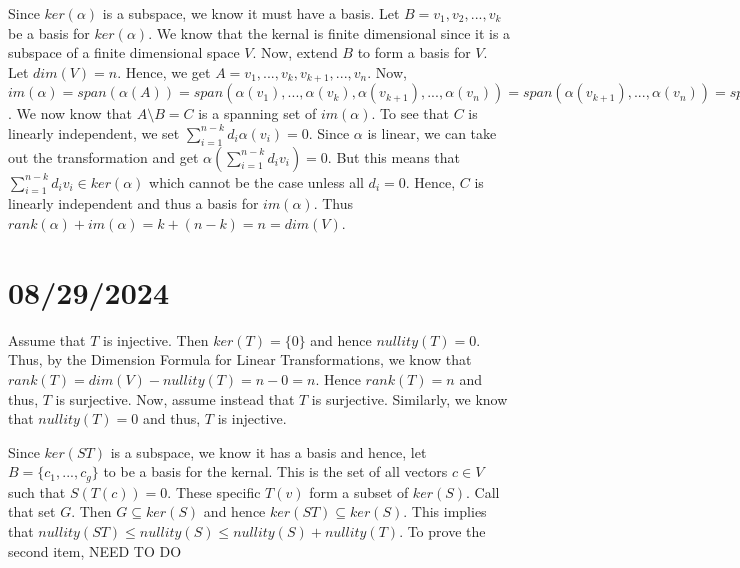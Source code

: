 \documentclass{report}
\begin{document}
\begin{myproof}
    Since $ker(\alpha)$ is a subspace, we know it must have a basis. Let $B = {v_1, v_2, ..., v_k}$ be a basis for $ker(\alpha)$. We know that the kernal is finite dimensional since it is a subspace of a finite dimensional space $V$. Now, extend $B$ to form a basis for $V$. Let $dim(V) = n$. Hence, we get $A = {v_1, ..., v_k, v_{k+1}, ..., v_n}$. Now, $im(\alpha) = span(\alpha(A)) = span(\alpha(v_1), ..., \alpha(v_k), \alpha(v_{k+1}), ..., \alpha(v_n)) = span(\alpha(v_{k+1}), ..., \alpha(v_n)) = span(A \setminus B)$. We now know that $A\setminus B = C$ is a spanning set of $im(\alpha)$. To see that $C$ is linearly independent, we set $\sum_{i=1}^{n-k} d_i\alpha(v_i) = 0$. Since $\alpha$ is linear, we can take out the transformation and get $\alpha(\sum_{i=1}^{n-k} d_iv_i) = 0$. But this means that $\sum_{i=1}^{n-k} d_iv_i \in ker(\alpha)$ which cannot be the case unless all $d_i = 0$. Hence, $C$ is linearly independent and thus a basis for $im(\alpha)$. Thus $rank(\alpha) + im(\alpha) = k + (n-k) = n = dim(V)$.
\end{myproof}

\section{08/29/2024}


\begin{myproof}
    Assume that $T$ is injective. Then $ker(T) = \{0\}$ and hence $nullity(T) = 0$. Thus, by the Dimension Formula for Linear Transformations, we know that $rank(T) = dim(V) - nullity(T) = n-0=n$. Hence $rank(T) = n$ and thus, $T$ is surjective. Now, assume instead that $T$ is surjective. Similarly, we know that $nullity(T) = 0$ and thus, $T$ is injective. 
\end{myproof}


\begin{myproof}
    Since $ker(ST)$ is a subspace, we know it has a basis and hence, let $B = \{c_1, ..., c_g\}$ to be a basis for the kernal. This is the set of all vectors $c\in V$ such that $S(T(c)) = 0$. These specific $T(v)$ form a subset of $ker(S)$. Call that set $G$. Then $G \subseteq ker(S)$ and hence $ker(ST) \subseteq ker(S)$. This implies that $nullity(ST) \leq nullity(S) \leq nullity(S) + nullity(T)$.
    \newline
    To prove the second item, NEED TO DO
\end{myproof}
\end{document}
